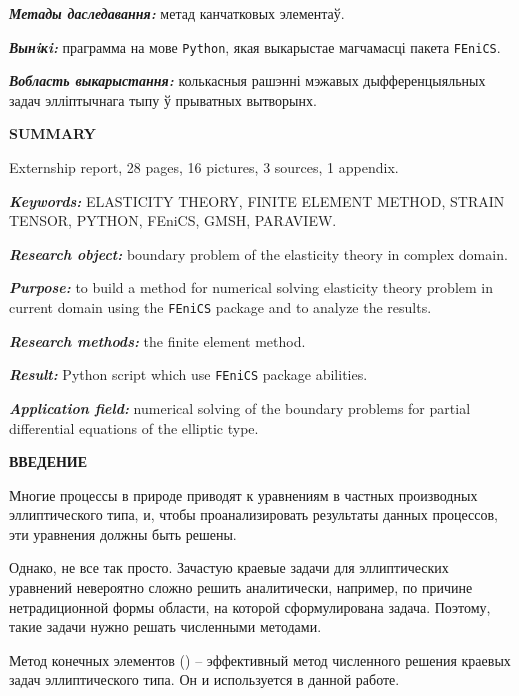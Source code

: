 \documentclass[a4paper, 14pt]{extreport}
\begin{document}
\textbf{\textit{Метады даследавання:}} метад канчатковых элементаў.

\textbf{\textit{Вынiкi:}} праграмма на мове \texttt{Python},
якая выкарыстае магчамасці пакета \texttt{FEniCS}.

\textbf{\textit{Вобласть выкарыстання:}} колькасныя рашэнні мэжавых 
дыфференцыяльных задач элліптычнага тыпу ў прыватных вытворынх.


\begin{center}
	\Large{\textbf{SUMMARY}}
\end{center}

Externship report, 28 pages, 16 pictures, 3 sources, 1 appendix.

\textbf{\textit{Keywords:}} ELASTICITY THEORY, FINITE ELEMENT METHOD,
STRAIN TENSOR, PYTHON, FEniCS, GMSH, 
PARAVIEW.

\textbf{\textit{Research object:}} boundary problem of the elasticity
theory in complex domain.

\textbf{\textit{Purpose:}} to build a method for numerical solving 
elasticity theory problem in current domain using the \texttt{FEniCS}
package and to analyze the results.

\textbf{\textit{Research methods:}} the finite element method.

\textbf{\textit{Result:}} Python script which use \texttt{FEniCS}
package abilities.

\textbf{\textit{Application field:}} numerical solving of the
boundary problems for partial differential equations of the elliptic type.


\newpage
{}
\begin{center}
	\Large{\textbf{ВВЕДЕНИЕ}}
\end{center}

Многие процессы в природе приводят к уравнениям в частных производных
эллиптического типа, и, чтобы проанализировать результаты данных процессов,
эти уравнения должны быть решены.

Однако, не все так просто. Зачастую краевые задачи для эллиптических
уравнений невероятно сложно решить аналитически, например, по причине
нетрадиционной формы области, на которой сформулирована задача.
Поэтому, такие задачи нужно решать численными методами.

Метод конечных элементов (\cite{finite_element_method}) -- эффективный метод численного решения краевых задач
эллиптического типа. Он и используется в данной работе.
\end{document}
